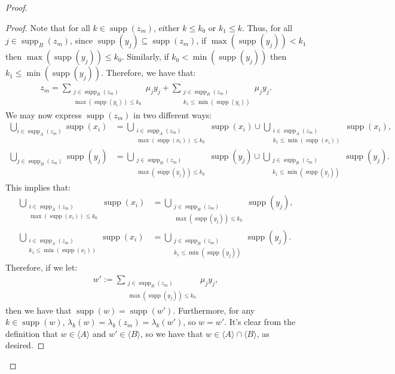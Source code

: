 \documentclass[11pt,reqno]{amsart}
\theoremstyle{plain}
\numberwithin{equation}{section}
\theoremstyle{definition}
\newcommand{\func}{\operatorname}
\renewcommand{\c}[1]{\langle #1 \rangle}
\newcommand{\supp}{\func{supp}}
\newenvironment{midproof}[1][Proof]
  {\begin{proof}[#1]\renewcommand{\qedsymbol}{$\blacksquare$}}
  {\end{proof}}
\begin{document}
\begin{proof}
\begin{midproof}
        Note that for all $k \in \supp(z_m)$, either $k \leq k_0$ or $k_1 \leq k$. Thus, for all $j \in \supp_B(z_m)$, since $\supp(y_j) \subseteq \supp(z_m)$, if $\max(\supp(y_j)) < k_1$ then $\max(\supp(y_j)) \leq k_0$. Similarly, if $k_0 < \min(\supp(y_j))$ then $k_1 \leq \min(\supp(y_j))$. Therefore, we have that:
        \begin{align*}
            z_m = \sum_{\substack{j \in \supp_B(z_m) \\ \max(\supp(y_i)) \leq k_0}} \mu_j y_j + \sum_{\substack{j \in \supp_B(z_m) \\ k_1 \leq \min(\supp(y_i))}} \mu_j y_j.
        \end{align*}
        We may now express $\supp(z_m)$ in two different ways:
        \begin{align*}
            \bigcup_{i \in \supp_A(z_m)} \supp(x_i) &= \bigcup_{\substack{i \in \supp_A(z_m) \\ \max(\supp(x_i)) \leq k_0}} \supp(x_i) \cup \bigcup_{\substack{i \in \supp_A(z_m) \\ k_1 \leq \min(\supp(x_i))}} \supp(x_i), \\
            \bigcup_{j \in \supp_B(z_m)} \supp(y_j) &= \bigcup_{\substack{j \in \supp_B(z_m) \\ \max(\supp(y_j)) \leq k_0}} \supp(y_j) \cup \bigcup_{\substack{j \in \supp_B(z_m) \\ k_1 \leq \min(\supp(y_j))}} \supp(y_j).
        \end{align*}
        This implies that:
        \begin{align*}
            \bigcup_{\substack{i \in \supp_A(z_m) \\ \max(\supp(x_i)) \leq k_0}} \supp(x_i) &= \bigcup_{\substack{j \in \supp_B(z_m) \\ \max(\supp(y_j)) \leq k_0}} \supp(y_j), \\
            \bigcup_{\substack{i \in \supp_A(z_m) \\ k_1 \leq \min(\supp(x_i))}} \supp(x_i) &= \bigcup_{\substack{j \in \supp_B(z_m) \\ k_1 \leq \min(\supp(y_j))}} \supp(y_j).
        \end{align*}
        Therefore, if we let:
        \begin{align*}
            w' := \sum_{\substack{j \in \supp_B(z_m) \\ \max(\supp(y_j)) \leq k_0}} \mu_jy_j,
        \end{align*}
        then we have that $\supp(w) = \supp(w')$. Furthermore, for any $k \in \supp(w)$, $\lambda_k(w) = \lambda_k(z_m) = \lambda_k(w')$, so $w = w'$. It's clear from the definition that $w \in \c{A}$ and $w' \in \c{B}$, so we have that $w \in \c{A} \cap \c{B}$, as desired.
    \end{midproof}


\end{proof}
\end{document}

